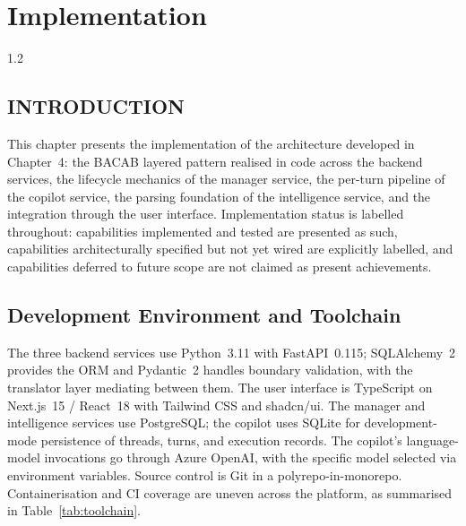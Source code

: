 \chapter{Implementation}
\begin{spacing}{1.2}
\minitoc
\thispagestyle{MyStyle}
\end{spacing}
\newpage

\section*{INTRODUCTION}
This chapter presents the implementation of the architecture developed in Chapter~4: the BACAB layered pattern realised in code across the backend services, the lifecycle mechanics of the manager service, the per-turn pipeline of the copilot service, the parsing foundation of the intelligence service, and the integration through the user interface. Implementation status is labelled throughout: capabilities implemented and tested are presented as such, capabilities architecturally specified but not yet wired are explicitly labelled, and capabilities deferred to future scope are not claimed as present achievements.

\section{Development Environment and Toolchain}
The three backend services use Python~3.11 with FastAPI~0.115; SQLAlchemy~2 provides the ORM and Pydantic~2 handles boundary validation, with the translator layer mediating between them. The user interface is TypeScript on Next.js~15 / React~18 with Tailwind CSS and shadcn/ui. The manager and intelligence services use PostgreSQL; the copilot uses SQLite for development-mode persistence of threads, turns, and execution records. The copilot's language-model invocations go through Azure OpenAI, with the specific model selected via environment variables. Source control is Git in a polyrepo-in-monorepo. Containerisation and CI coverage are uneven across the platform, as summarised in Table~\ref{tab:toolchain}.

